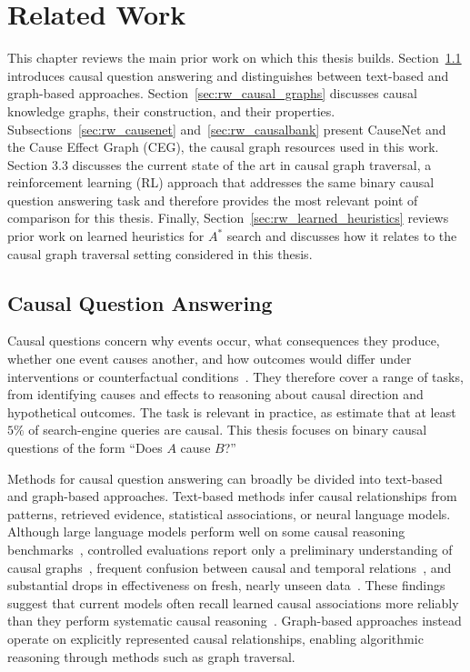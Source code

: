 \chapter{Related Work}
\label{chap:related_work}

This chapter reviews the main prior work on which this thesis builds. Section~\ref{sec:rw_causal_qa} introduces causal question answering and distinguishes between text-based and graph-based approaches. Section~\ref{sec:rw_causal_graphs} discusses causal knowledge graphs, their
construction, and their properties. Subsections~\ref{sec:rw_causenet} and~\ref{sec:rw_causalbank} present CauseNet and the Cause Effect Graph (CEG), the causal graph resources used in this work. Section 3.3 discusses the current state of the art in causal graph traversal, a reinforcement learning (RL) approach that addresses the same binary causal question answering task and therefore provides the most relevant point of comparison for this thesis. Finally, Section~\ref{sec:rw_learned_heuristics} reviews prior work on learned heuristics for $A^*$ search and discusses how it relates to the causal graph traversal setting considered in this thesis.

\section{Causal Question Answering}
\label{sec:rw_causal_qa}

Causal questions concern why events occur, what consequences they produce, whether one event causes another, and how outcomes would differ under interventions or counterfactual conditions~\cite{bondarenko:2022,wang:2024}. They therefore cover a range of tasks, from identifying causes and effects to reasoning about causal direction and hypothetical outcomes. The task is relevant in practice, as \citet{bondarenko:2022} estimate that at least $5\%$ of search-engine queries are causal. This thesis focuses on binary causal questions of the form ``Does $A$ cause $B$?''

Methods for causal question answering can broadly be divided into text-based and graph-based approaches. Text-based methods infer causal relationships from patterns, retrieved evidence, statistical associations, or neural language models. Although large language models perform well on some causal reasoning benchmarks~\cite{kiciman:2024}, controlled evaluations report only a preliminary understanding of causal graphs~\cite{chen:2024}, frequent confusion between causal and temporal relations~\cite{miliani:2025}, and substantial drops in effectiveness on fresh, nearly unseen data~\cite{chi:2024}. These findings suggest that current models often recall learned causal associations more reliably than they perform systematic causal reasoning~\cite{wu:2024}. Graph-based approaches instead operate on explicitly represented causal relationships, enabling algorithmic reasoning through methods such as graph traversal.

